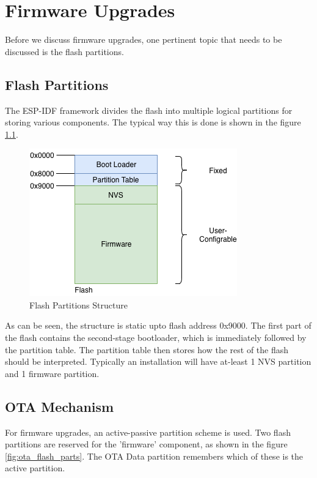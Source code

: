 \documentclass[main.tex]{subfiles}
\begin{document}
\chapter{Firmware Upgrades}

Before we discuss firmware upgrades, one pertinent topic that needs to be discussed is the flash partitions.

\section{Flash Partitions}\label{sec:flash_partitions}
The ESP-IDF framework divides the flash into multiple logical partitions for storing various components. The typical way this is done is shown in the figure \ref{fig:flash_parts}.
\begin{figure}[h!]
    \centering
    \includegraphics{../../_static/flash_partitions_intro.png}
    \caption{Flash Partitions Structure}
    \label{fig:flash_parts}
\end{figure}

As can be seen, the structure is static upto flash address 0x9000. The first part of the flash contains the second-stage bootloader, which is immediately followed by the partition table. The partition table then stores how the rest of the flash should be interpreted. Typically an installation will have at-least 1 NVS partition and 1 firmware partition.

\section{OTA Mechanism}
For firmware upgrades, an active-passive partition scheme is used. Two flash partitions are reserved for the 'firmware' component, as shown in the figure \ref{fig:ota_flash_parts}. The OTA Data partition remembers which of these is the active partition.
\end{document}
